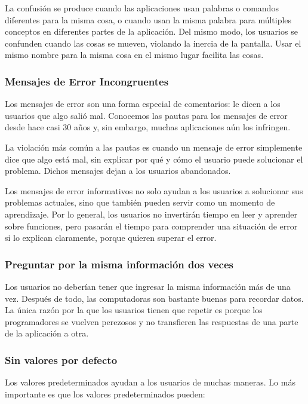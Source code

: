 		\par \noindent
			La confusión se produce cuando las aplicaciones usan palabras o comandos diferentes para la misma cosa, o cuando usan la misma palabra para múltiples conceptos en diferentes partes de la aplicación. Del mismo modo, los usuarios se confunden cuando las cosas se mueven, violando la inercia de la pantalla. Usar el mismo nombre para la misma cosa en el mismo lugar facilita las cosas.
			
	\subsubsection{Mensajes de Error Incongruentes}
		\par 
			Los mensajes de error son una forma especial de comentarios: le dicen a los usuarios que algo salió mal. Conocemos las pautas para los mensajes de error desde hace casi 30 años y, sin embargo, muchas aplicaciones aún los infringen.
			
		\par \noindent
			La violación más común a las pautas es cuando un mensaje de error simplemente dice que algo está mal, sin explicar por qué y cómo el usuario puede solucionar el problema. Dichos mensajes dejan a los usuarios abandonados.
		
		\par \noindent
			Los mensajes de error informativos no solo ayudan a los usuarios a solucionar sus problemas actuales, sino que también pueden servir como un momento de aprendizaje. Por lo general, los usuarios no invertirán tiempo en leer y aprender sobre funciones, pero pasarán el tiempo para comprender una situación de error si lo explican claramente, porque quieren superar el error.
			
	\subsubsection{Preguntar por la misma información dos veces}
		\par
			Los usuarios no deberían tener que ingresar la misma información más de una vez. Después de todo, las computadoras son bastante buenas para recordar datos. La única razón por la que los usuarios tienen que repetir es porque los programadores se vuelven perezosos y no transfieren las respuestas de una parte de la aplicación a otra.
			
\clearpage
\thispagestyle{plain}

	\subsubsection{Sin valores por defecto}
		\par 
			Los valores predeterminados ayudan a los usuarios de muchas maneras. Lo más importante es que los valores predeterminados pueden:
		
